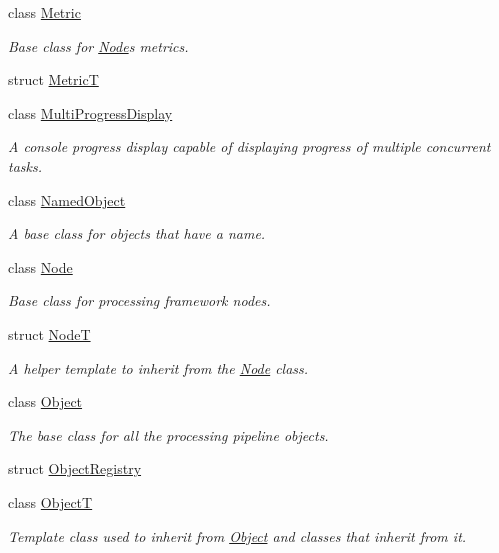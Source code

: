 \begin{DoxyCompactItemize}
class \hyperlink{classdg_1_1deepcore_1_1_metric}{Metric}
\begin{DoxyCompactList}\small\item\em Base class for \hyperlink{classdg_1_1deepcore_1_1_node}{Node}\textquotesingle{}s metrics. \end{DoxyCompactList}\item 
struct \hyperlink{structdg_1_1deepcore_1_1_metric_t}{MetricT}
\item 
class \hyperlink{classdg_1_1deepcore_1_1_multi_progress_display}{Multi\+Progress\+Display}
\begin{DoxyCompactList}\small\item\em A console progress display capable of displaying progress of multiple concurrent tasks. \end{DoxyCompactList}\item 
class \hyperlink{classdg_1_1deepcore_1_1_named_object}{Named\+Object}
\begin{DoxyCompactList}\small\item\em A base class for objects that have a name. \end{DoxyCompactList}\item 
class \hyperlink{classdg_1_1deepcore_1_1_node}{Node}
\begin{DoxyCompactList}\small\item\em Base class for processing framework nodes. \end{DoxyCompactList}\item 
struct \hyperlink{structdg_1_1deepcore_1_1_node_t}{NodeT}
\begin{DoxyCompactList}\small\item\em A helper template to inherit from the \hyperlink{classdg_1_1deepcore_1_1_node}{Node} class. \end{DoxyCompactList}\item 
class \hyperlink{classdg_1_1deepcore_1_1_object}{Object}
\begin{DoxyCompactList}\small\item\em The base class for all the processing pipeline objects. \end{DoxyCompactList}\item 
struct \hyperlink{structdg_1_1deepcore_1_1_object_registry}{Object\+Registry}
\item 
class \hyperlink{classdg_1_1deepcore_1_1_object_t}{ObjectT}
\begin{DoxyCompactList}\small\item\em Template class used to inherit from \hyperlink{classdg_1_1deepcore_1_1_object}{Object} and classes that inherit from it. \end{DoxyCompactList}\item 

\end{DoxyCompactItemize}
